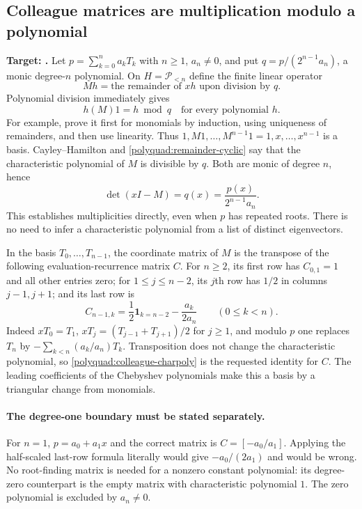 \documentclass[11pt]{article}
\newcommand{\code}[1]{\ifmmode\text{\small\nolinkurl{#1}}\else{\small\nolinkurl{#1}}\fi}
\theoremstyle{remark}
\numberwithin{equation}{section}
\begin{document}
\subsection{Colleague matrices are multiplication modulo a polynomial}
\label{polyquad:colleague}
\noindent\textbf{Target: \code{colleague-matrix}.}
Let $p=\sum_{k=0}^n a_kT_k$ with $n\ge1$, $a_n\ne0$, and put
$q=p/(2^{n-1}a_n)$, a monic degree-$n$ polynomial. On
$H=\mathcal P_{<n}$ define the finite linear operator
\[
 M h=\text{the remainder of }xh\text{ upon division by }q.
\]
Polynomial division immediately gives
\begin{equation}
 h(M)1=h\bmod q\quad\text{for every polynomial }h.
 \label{polyquad:remainder-cyclic}
\end{equation}
For example, prove it first for monomials by induction, using uniqueness
of remainders, and then use linearity. Thus
$1,M1,\ldots,M^{n-1}1=1,x,\ldots,x^{n-1}$ is a basis.
Cayley--Hamilton and \eqref{polyquad:remainder-cyclic} say that the
characteristic polynomial of $M$ is divisible by $q$. Both are monic
of degree $n$, hence
\begin{equation}
 \det(xI-M)=q(x)=\frac{p(x)}{2^{n-1}a_n}.
 \label{polyquad:colleague-charpoly}
\end{equation}
This establishes multiplicities directly, even when $p$ has repeated
roots. There is no need to infer a characteristic polynomial from a
list of distinct eigenvectors.

In the basis $T_0,\ldots,T_{n-1}$, the coordinate matrix of $M$ is
the transpose of the following evaluation-recurrence matrix $C$.
For $n\ge2$, its first row has $C_{0,1}=1$ and all other entries zero;
for $1\le j\le n-2$, its $j$th row has $1/2$ in columns $j-1,j+1$;
and its last row is
\begin{equation}
 C_{n-1,k}=\frac12\boldsymbol{1}_{k=n-2}
                  -\frac{a_k}{2a_n}\qquad(0\le k<n).
 \label{polyquad:colleague-entries}
\end{equation}
Indeed $xT_0=T_1$, $xT_j=(T_{j-1}+T_{j+1})/2$ for $j\ge1$,
and modulo $p$ one replaces
$T_n$ by $-\sum_{k<n}(a_k/a_n)T_k$.
Transposition does not change the characteristic polynomial, so
\eqref{polyquad:colleague-charpoly} is the requested identity for $C$.
The leading coefficients of the Chebyshev polynomials make this a
basis by a triangular change from monomials.

\paragraph{The degree-one boundary must be stated separately.}
For $n=1$, $p=a_0+a_1x$ and the correct matrix is
$C=[-a_0/a_1]$. Applying the half-scaled last-row formula literally
would give $-a_0/(2a_1)$ and would be wrong. No root-finding matrix is
needed for a nonzero constant polynomial: its degree-zero counterpart
is the empty matrix with characteristic polynomial $1$. The zero
polynomial is excluded by $a_n\ne0$.
\end{document}
